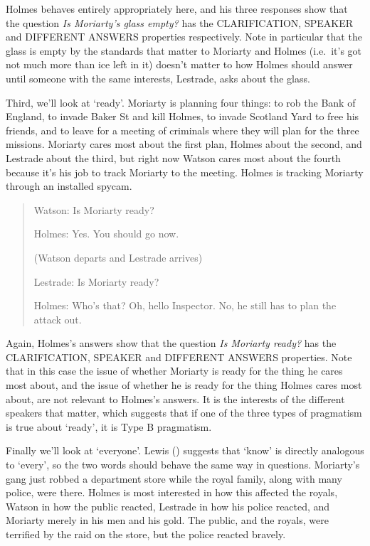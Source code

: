 \documentclass[
  10pt,
  letterpaper,
  DIV=11,
  numbers=noendperiod,
  twoside]{scrartcl}
\begin{document}
Holmes behaves entirely appropriately here, and his three responses show
that the question \emph{Is Moriarty's glass empty?} has the
CLARIFICATION, SPEAKER and DIFFERENT ANSWERS properties respectively.
Note in particular that the glass is empty by the standards that matter
to Moriarty and Holmes (i.e.~it's got not much more than ice left in it)
doesn't matter to how Holmes should answer until someone with the same
interests, Lestrade, asks about the glass.

Third, we'll look at `ready'. Moriarty is planning four things: to rob
the Bank of England, to invade Baker St and kill Holmes, to invade
Scotland Yard to free his friends, and to leave for a meeting of
criminals where they will plan for the three missions. Moriarty cares
most about the first plan, Holmes about the second, and Lestrade about
the third, but right now Watson cares most about the fourth because it's
his job to track Moriarty to the meeting. Holmes is tracking Moriarty
through an installed spycam.

\begin{quote}
Watson: Is Moriarty ready?

Holmes: Yes. You should go now.

(Watson departs and Lestrade arrives)

Lestrade: Is Moriarty ready?

Holmes: Who's that? Oh, hello Inspector. No, he still has to plan the
attack out.
\end{quote}

Again, Holmes's answers show that the question \emph{Is Moriarty ready?}
has the CLARIFICATION, SPEAKER and DIFFERENT ANSWERS properties. Note
that in this case the issue of whether Moriarty is ready for the thing
he cares most about, and the issue of whether he is ready for the thing
Holmes cares most about, are not relevant to Holmes's answers. It is the
interests of the different speakers that matter, which suggests that if
one of the three types of pragmatism is true about `ready', it is Type B
pragmatism.

Finally we'll look at `everyone'. Lewis
() suggests that `know' is directly
analogous to `every', so the two words should behave the same way in
questions. Moriarty's gang just robbed a department store while the
royal family, along with many police, were there. Holmes is most
interested in how this affected the royals, Watson in how the public
reacted, Lestrade in how his police reacted, and Moriarty merely in his
men and his gold. The public, and the royals, were terrified by the raid
on the store, but the police reacted bravely.
\end{document}
